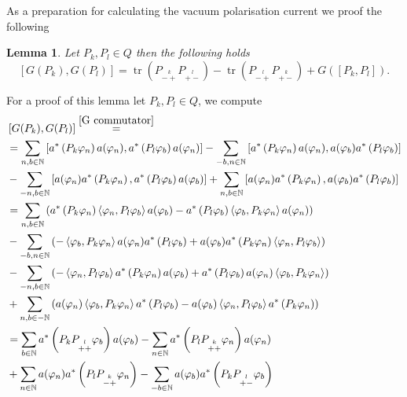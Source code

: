 \documentclass[b5paper,draft,openbib,12pt]{memoir}
\newtheorem{Lemma}[Def]{Lemma}
\DeclareMathOperator{\tr}{tr}
\begin{document}
As a preparation for calculating the vacuum polarisation current we proof the following 
\begin{Lemma}\label{G_kommutator}
Let \(P_k,P_l\in Q\) then the following holds
\begin{equation}
\left[G(P_k),G(P_l)\right]= 
\tr\left(P_{\stackrel{k}{-+}}P_{\stackrel{l}{+-}}\right)
-\tr\left(P_{\stackrel{l}{-+}}P_{\stackrel{k}{+-}}\right) 
+G\left(\left[P_k,P_l\right]\right)
.\end{equation}
\end{Lemma}
For a proof of this lemma let \(P_k,P_l \in Q\), we compute
\begin{align*}
&\left[G(P_k),G(P_l)\right]\stackrel{\eqref{G commutator}}{=}\\
&=\sum_{n,b\in\mathbb{N}} \left[ a^*\left(P_k\varphi_n\right) a(\varphi_n), a^*\left(P_l\varphi_b\right)a(\varphi_n)\right]
-\sum_{-b,n\in\mathbb{N}}\left[a^*\left(P_k\varphi_n\right)a(\varphi_n), a(\varphi_b) a^*\left(P_l\varphi_b\right)\right]\\
&-\sum_{-n,b\in\mathbb{N}}\left[a(\varphi_n)a^*\left(P_k\varphi_n\right),a^*\left(P_l\varphi_b\right)a(\varphi_b)\right]
+\sum_{n,b\in\mathbb{N}}\left[ a(\varphi_n)a^*\left(P_k\varphi_n\right), a(\varphi_b)a^*\left(P_l\varphi_b\right)\right]\\
&=\sum_{n,b\in\mathbb{N}} \left(a^*\left(P_k\varphi_n\right)\left<\varphi_n,P_l\varphi_b\right>a(\varphi_b)-a^*\left(P_l\varphi_b\right) \left<\varphi_b,P_k\varphi_n\right>a(\varphi_n) \right)\\
&-\sum_{-b,n\in\mathbb{N}}\left( - \left<\varphi_b,P_k \varphi_n\right>a(\varphi_n)a^*\left(P_l\varphi_b\right) + a(\varphi_b) a^*\left(P_k\varphi_n\right)\left<\varphi_n,P_l\varphi_b\right>\right)\\
&-\sum_{-n,b\in\mathbb{N}} \left( - \left< \varphi_n,P_l\varphi_b\right> a^*\left(P_k\varphi_n\right) a(\varphi_b) + a^*\left(P_l\varphi_b\right)a(\varphi_n)\left<\varphi_b,P_k\varphi_n\right>\right)\\
&+\sum_{n,b\in -\mathbb{N}} \left(a(\varphi_n) \left< \varphi_b,P_k\varphi_n\right>a^*\left(P_l\varphi_b\right)-a(\varphi_b)\left<\varphi_n,P_l\varphi_b\right> a^*\left(P_k\varphi_n\right)\right)\\
&=\sum_{b\in\mathbb{N}} a^*\left(P_k P_{\stackrel{l}{++}}\varphi_b\right)a(\varphi_b) - \sum_{n\in\mathbb{N}}a^*\left(P_l P_{\stackrel{k}{++}}\varphi_n\right)a(\varphi_n)\\
&+\sum_{n\in\mathbb{N}}a(\varphi_n)a^*\left(P_l P_{\stackrel{k}{-+}}\varphi_n\right) - \sum_{-b\in\mathbb{N}} a(\varphi_b)a^*\left(P_k P_{\stackrel{l}{+-}}\varphi_b\right)\\

\end{align*}
\end{document}
